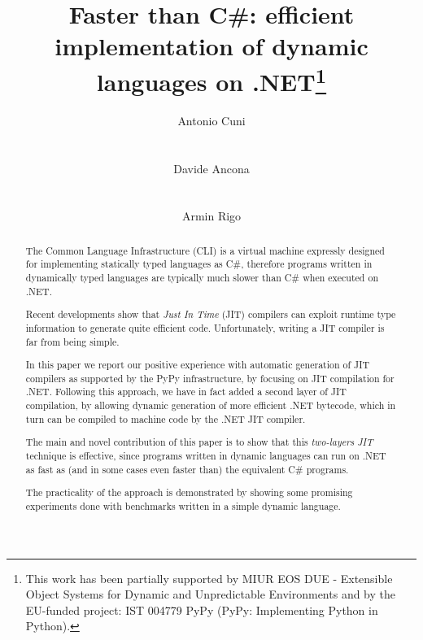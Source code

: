 \documentclass{acm_proc_article-sp}
\begin{document}

\title{Faster than C\#: efficient implementation of dynamic languages on
  .NET\thanks{This work has been partially supported by MIUR EOS DUE -
    Extensible Object Systems for Dynamic and Unpredictable Environments and
    by the EU-funded project: IST 004779 PyPy (PyPy: Implementing Python in
    Python).}}



\author{
\alignauthor Antonio Cuni\\
       \\
       \\
\alignauthor Davide Ancona\\
       \\
       \\
\alignauthor Armin Rigo\\
}
\maketitle

\begin{abstract}
The Common Language Infrastructure (CLI) is a virtual machine expressly
designed for implementing statically typed languages as C\#, therefore
programs written in dynamically typed languages are typically much slower than C\# when executed on .NET.

Recent developments show that \emph{Just In Time} (JIT) compilers can exploit runtime type
information to generate quite efficient code.  Unfortunately, writing a JIT
compiler is far from being simple.  

In this paper we report our positive
experience with automatic generation of JIT compilers as supported by the PyPy
infrastructure, by focusing on JIT compilation for .NET.
Following this approach, we have in fact added a second layer of JIT compilation, by allowing dynamic generation of more efficient .NET bytecode, which
in turn can be compiled to machine code by the .NET JIT compiler.   

The main and novel contribution of this paper is to show that this
\emph{two-layers JIT} technique is effective, since programs written in dynamic languages 
can run on .NET as fast as (and in some cases even faster than) the equivalent C\# programs.

The practicality of the approach is demonstrated by showing some promising
experiments done with benchmarks written in a simple dynamic language.
\end{abstract}









\bigskip



\end{document}

